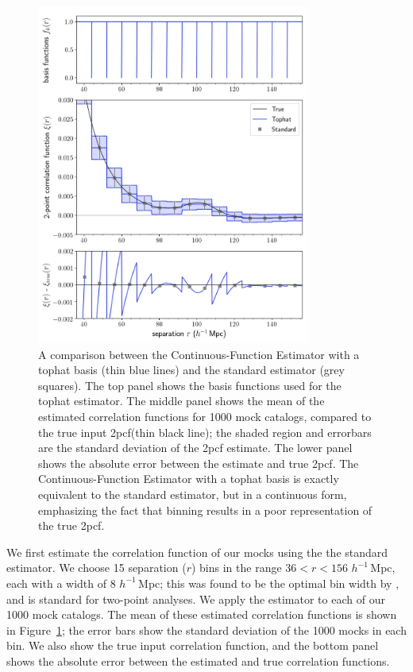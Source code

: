 \documentclass[modern]{aastex62}
\newcommand{\cf}{2pcf\xspace}
\newcommand{\Est}{The Continuous-Function Estimator\xspace}
\newcommand{\est}{the Continuous-Function Estimator\xspace}
\newcommand{\hmpc}{$h^{-1}\,$Mpc}
\begin{document}
\begin{figure}[ht]
    \centering
    \includegraphics[width=0.8\textwidth]{xicomparison_2e-4_tophat8_theory8}
    \caption{A comparison between \est with a tophat basis (thin blue lines) and the standard estimator (grey squares). The top panel shows the basis functions used for the tophat estimator. The middle panel shows the mean of the estimated correlation functions for 1000 mock catalogs, compared to the true input \cf (thin black line); the shaded region and errorbars are the standard deviation of the \cf estimate. The lower panel shows the absolute error between the estimate and true \cf. \Est with a tophat basis is exactly equivalent to the standard estimator, but in a continuous form, emphasizing the fact that binning results in a poor representation of the true \cf.}
    \label{fig:tophat}
\end{figure}
    
We first estimate the correlation function of our mocks using the the standard estimator.
We choose 15 separation ($r$) bins in the range $36 < r < 156$ \hmpc, each with a width of 8 \hmpc; this was found to be the optimal bin width by \cite{Percival2014}, and is standard for two-point analyses.
We apply the estimator to each of our 1000 mock catalogs.
The mean of these estimated correlation functions is shown in Figure~\ref{fig:tophat}; the error bars show the standard deviation of the 1000 mocks in each bin.
We also show the true input correlation function, and the bottom panel shows the absolute error between the estimated and true correlation functions.
\end{document}
